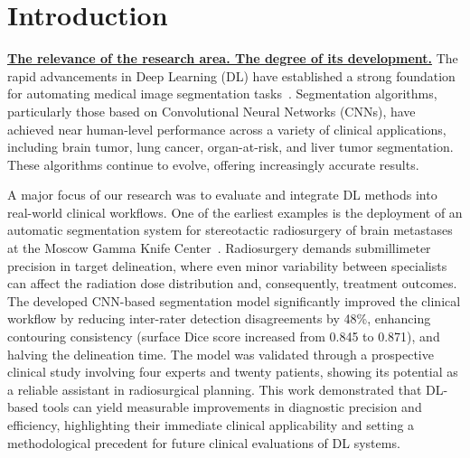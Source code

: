 

\chapter*{Introduction}
\label{chap:Introduction}


\underline{\textbf{The relevance of the research area. The degree of its development.}}
The rapid advancements in Deep Learning (DL) have established a strong foundation for automating medical image segmentation tasks~\cite{lee2017deep}. Segmentation algorithms, particularly those based on Convolutional Neural Networks (CNNs), have achieved near human-level performance across a variety of clinical applications, including brain tumor, lung cancer, organ-at-risk, and liver tumor segmentation. These algorithms continue to evolve, offering increasingly accurate results.


A major focus of our research was to evaluate and integrate DL methods into real-world clinical workflows. One of the earliest examples is the deployment of an automatic segmentation system for stereotactic radiosurgery of brain metastases at the Moscow Gamma Knife Center~\cite{shirokikh2022systematic}. Radiosurgery demands submillimeter precision in target delineation, where even minor variability between specialists can affect the radiation dose distribution and, consequently, treatment outcomes. The developed CNN-based segmentation model significantly improved the clinical workflow by reducing inter-rater detection disagreements by 48\%, enhancing contouring consistency (surface Dice score increased from 0.845 to 0.871), and halving the delineation time. The model was validated through a prospective clinical study involving four experts and twenty patients, showing its potential as a reliable assistant in radiosurgical planning. This work demonstrated that DL-based tools can yield measurable improvements in diagnostic precision and efficiency, highlighting their immediate clinical applicability and setting a methodological precedent for future clinical evaluations of DL systems.


